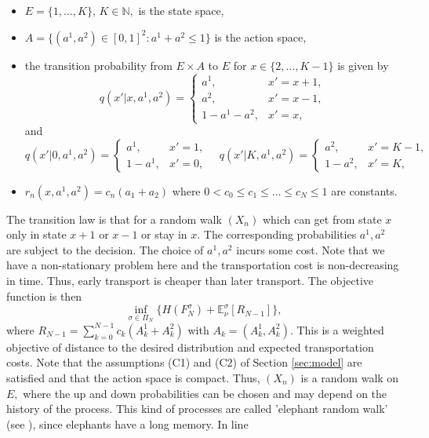 \documentclass[reqno, 12pt]{amsart}%
\newcommand{\N}{\mathbb{N}} %
\newcommand{\EE}{\mathbb{E}}
\theoremstyle{definition}
\numberwithin{equation}{section} \numberwithin{theorem}{section}
\begin{document}
\begin{itemize}
\item[(i)] $E= \{1, \ldots ,K\},\, K\in\N,$  is the state space,
\item[(ii)] $A= \{(a^1,a^2)\in [0,1]^2 : a^1+a^2 \le 1  \}$
 is the  action space,
 \item[(iii)] the transition probability from $E\times A$ to $E$ for $x\in  \{ 2, \ldots ,K-1\}$ is given by
 $$ q(x'|x,a^1,a^2)= \left\{ \begin{array}{cc}
   a^1,   &  x'=x+1,\\
   a^2,   & x'=x-1,\\
   1-a^1 -a^2, & x'=x,
 \end{array}\right.$$
 and 
 $$ q(x'|0,a^1,a^2)= \left\{ \begin{array}{cc}
   a^1,   &  x'=1,\\
   1-a^1, & x'=0,
 \end{array}\right. \quad  q(x'|K,a^1,a^2)= \left\{ \begin{array}{cc}
   a^2,   &  x'=K-1,\\
   1-a^2 , & x'=K,
 \end{array}\right.$$
 \item[(iv)] $r_n(x,a^1,a^2)= c_n(a_1+a_2)$ where $0<c_0\le c_1 \le \ldots \le c_N\le 1$ are constants.
\end{itemize}
 The transition law is that for a random walk $(X_n)$ which can get from state $x$ only in state $x+1$ or $x-1$ or stay in $x$. The corresponding probabilities $a^1, a^2$ are subject to the decision. The choice of $a^1,a^2$ incurs some cost.
Note that we have a non-stationary problem here and the  transportation cost is non-decreasing in time. Thus, early transport is cheaper than later transport. The objective function is then
\begin{equation}\label{eq:prob_ex}
    \inf_{\sigma\in \Pi_N} \Big\{H(F_N^\sigma) +  \EE_\nu^\sigma [R_{N-1}]\Big\},
\end{equation} 
where $R_{N-1}=\sum_{k=0}^{N-1} c_k(A_k^1+A_k^2)$ with $A_k=(A_k^1,A_k^2).$ This is a weighted objective of distance to the desired distribution and expected transportation costs.
Note that the assumptions (C1) and (C2) of Section \ref{sec:model}  are satisfied and that the action space is compact. 
Thus, $(X_n)$ is a random walk on $E,$
where the up and down probabilities can be 
chosen and may depend on the history of the 
process. This kind of processes are called 
'elephant random walk' (see
\cite{gut2021variations}), 
since elephants have a long memory. In line 
\end{document}
